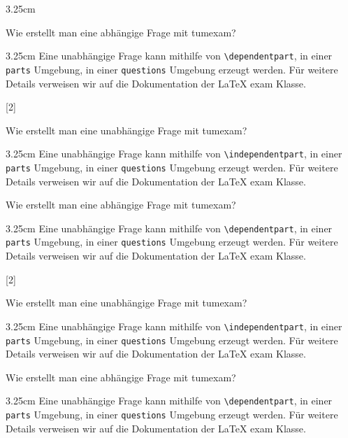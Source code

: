 \documentclass[german, @CLASSOPTIONS@]{tumexam}
\begin{document}
\begin{questions}
\begin{parts}
\begin{solutionbox}{3.25cm}
    \end{solutionbox}
    \dependentpart
    Wie erstellt man eine abhängige Frage mit tumexam?
    \begin{solutionbox}{3.25cm}
      Eine unabhängige Frage kann mithilfe von \texttt{\textbackslash{dependentpart}}, in einer \texttt{parts} Umgebung, in einer \texttt{questions} Umgebung erzeugt werden. Für weitere Details verweisen wir auf die Dokumentation der \LaTeX{} exam Klasse.
    \end{solutionbox}
  \end{parts}
  \clearpage
  [2]
  \begin{parts}
    \independentpart
    Wie erstellt man eine unabhängige Frage mit tumexam?
    \begin{solutionbox}{3.25cm}
      Eine unabhängige Frage kann mithilfe von \texttt{\textbackslash{independentpart}}, in einer \texttt{parts} Umgebung, in einer \texttt{questions} Umgebung erzeugt werden. Für weitere Details verweisen wir auf die Dokumentation der \LaTeX{} exam Klasse.
    \end{solutionbox}
    \dependentpart
    Wie erstellt man eine abhängige Frage mit tumexam?
    \begin{solutionbox}{3.25cm}
      Eine unabhängige Frage kann mithilfe von \texttt{\textbackslash{dependentpart}}, in einer \texttt{parts} Umgebung, in einer \texttt{questions} Umgebung erzeugt werden. Für weitere Details verweisen wir auf die Dokumentation der \LaTeX{} exam Klasse.
    \end{solutionbox}
  \end{parts}
  \clearpage
  [2]
  \begin{parts}
    \independentpart
    Wie erstellt man eine unabhängige Frage mit tumexam?
    \begin{solutionbox}{3.25cm}
      Eine unabhängige Frage kann mithilfe von \texttt{\textbackslash{independentpart}}, in einer \texttt{parts} Umgebung, in einer \texttt{questions} Umgebung erzeugt werden. Für weitere Details verweisen wir auf die Dokumentation der \LaTeX{} exam Klasse.
    \end{solutionbox}
    \dependentpart
    Wie erstellt man eine abhängige Frage mit tumexam?
    \begin{solutionbox}{3.25cm}
      Eine unabhängige Frage kann mithilfe von \texttt{\textbackslash{dependentpart}}, in einer \texttt{parts} Umgebung, in einer \texttt{questions} Umgebung erzeugt werden. Für weitere Details verweisen wir auf die Dokumentation der \LaTeX{} exam Klasse.

\end{solutionbox}
\end{parts}
\end{questions}
\end{document}
